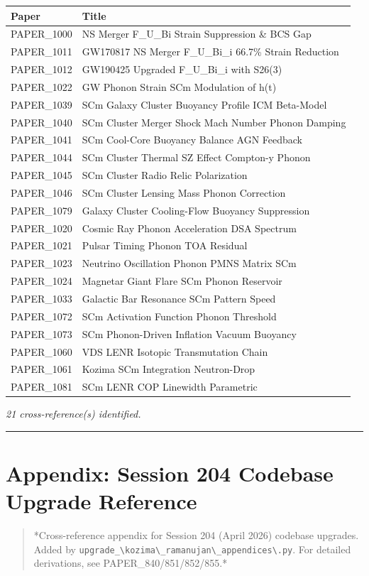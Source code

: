 \documentclass[12pt,a4paper]{article}
\begin{document}
\begin{table}[H]
\centering
\small
\begin{tabularx}{\linewidth}{@{}>{\raggedright\arraybackslash}X>{\raggedright\arraybackslash}X@{}}
\toprule
Paper & Title \tabularnewline
\midrule
PAPER\_1000 & NS Merger F\_{U\_Bi} Strain Suppression \& BCS Gap \tabularnewline
PAPER\_1011 & GW170817 NS Merger F\_{U\_Bi\_i} 66.7\% Strain Reduction \tabularnewline
PAPER\_1012 & GW190425 Upgraded F\_{U\_Bi\_i} with S26(3) \tabularnewline
PAPER\_1022 & GW Phonon Strain SCm Modulation of h(t) \tabularnewline
PAPER\_1039 & SCm Galaxy Cluster Buoyancy Profile ICM Beta-Model \tabularnewline
PAPER\_1040 & SCm Cluster Merger Shock Mach Number Phonon Damping \tabularnewline
PAPER\_1041 & SCm Cool-Core Buoyancy Balance AGN Feedback \tabularnewline
PAPER\_1044 & SCm Cluster Thermal SZ Effect Compton-y Phonon \tabularnewline
PAPER\_1045 & SCm Cluster Radio Relic Polarization \tabularnewline
PAPER\_1046 & SCm Cluster Lensing Mass Phonon Correction \tabularnewline
PAPER\_1079 & Galaxy Cluster Cooling-Flow Buoyancy Suppression \tabularnewline
PAPER\_1020 & Cosmic Ray Phonon Acceleration DSA Spectrum \tabularnewline
PAPER\_1021 & Pulsar Timing Phonon TOA Residual \tabularnewline
PAPER\_1023 & Neutrino Oscillation Phonon PMNS Matrix SCm \tabularnewline
PAPER\_1024 & Magnetar Giant Flare SCm Phonon Reservoir \tabularnewline
PAPER\_1033 & Galactic Bar Resonance SCm Pattern Speed \tabularnewline
PAPER\_1072 & SCm Activation Function Phonon Threshold \tabularnewline
PAPER\_1073 & SCm Phonon-Driven Inflation Vacuum Buoyancy \tabularnewline
PAPER\_1060 & VDS LENR Isotopic Transmutation Chain \tabularnewline
PAPER\_1061 & Kozima SCm Integration Neutron-Drop \tabularnewline
PAPER\_1081 & SCm LENR COP Linewidth Parametric \tabularnewline
\bottomrule
\end{tabularx}
\end{table}

\emph{21 cross-reference(s) identified.}

\medskip\hrule\medskip

\section{Appendix: Session 204 Codebase Upgrade Reference}

\begin{quote}
*Cross-reference appendix for Session 204 (April 2026) codebase upgrades.
Added by \texttt{upgrade\_\textbackslash {kozima\textbackslash \_ramanujan\textbackslash \_appendices\textbackslash }.py}. For detailed derivations,
see PAPER\_840/851/852/855.*
\end{quote}
\end{document}
